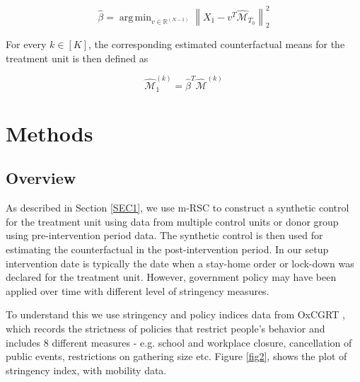 \documentclass[preprint,authoryear,12pt]{elsarticle}
\DeclareMathOperator*{\argmin}{arg\,min}
\begin{document}
	\begin{equation*}
	\hat{\beta} = \argmin_{v \in \mathbb{R}^{(N-1)} } \left\| X_1 - v^T \hat{\mathcal{M}}_{T_0}\right\|^2_2
	\end{equation*}
	
	For every $k \in [K]$, the corresponding estimated counterfactual means for the treatment unit is then defined as
	
	\begin{equation*}
	\hat{\mathcal{M}}_1^{(k)} = \hat{\beta}^T \hat{\mathcal{M}}^{(k)}
	\end{equation*}
	
\section{Methods}
	\label{SEC2}
	\subsection{Overview}
	As described in Section \ref{SEC1}, we use m-RSC to construct a synthetic control for the treatment unit using data from multiple control units or donor group using pre-intervention period data.  The synthetic control is then used for estimating the counterfactual in the post-intervention period. In our setup intervention date is typically the date when a stay-home order or lock-down was declared for the treatment unit.  However, government policy may have been applied over time with different level of stringency measures. 
	
	To understand this we use stringency and policy indices data from OxCGRT \cite{HWP2020}, which records the strictness of policies that restrict people’s behavior and includes 8 different measures - e.g. school  and workplace closure, cancellation of public events, restrictions on gathering size etc. Figure \ref{fig2}, shows the plot of stringency index, with mobility data. 
\end{document}

